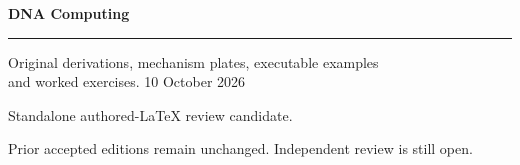 \documentclass[11pt,oneside,openany]{book}
\begin{document}
\frontmatter
\begin{titlepage}
\color{Blue}\sffamily\vspace*{20mm}
{\Huge\bfseries DNA Computing\par}
\vspace{10mm}{\LARGE Chapter 31\par}
\vspace{8mm}{\Large Modern molecular programming and evidence\par}
\vspace{12mm}\rule{\linewidth}{.8pt}
\vspace{6mm}\par Original derivations, mechanism plates, executable examples\\and worked exercises.
\vfill 10 October 2026\par
Standalone authored-LaTeX review candidate.\par
Prior accepted editions remain unchanged. Independent review is still open.
\end{titlepage}
\tableofcontents
\mainmatter
\setcounter{chapter}{30}

\renewcommand{\bibname}{Sources and references}

\backmatter
\clearpage{}
\printindex
\end{document}
